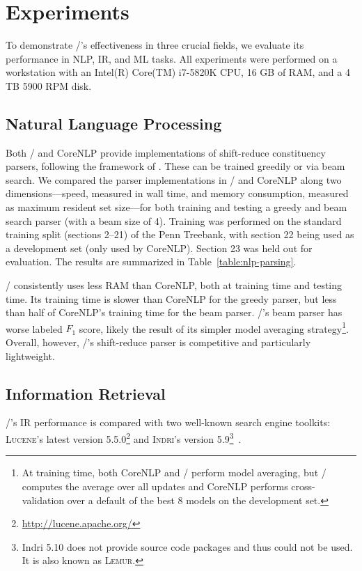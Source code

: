 \section{Experiments}
\label{sec:experiments}

To demonstrate \meta/'s effectiveness in three crucial fields, we evaluate its
performance in NLP, IR, and ML tasks. All experiments were performed on a
workstation with an Intel(R) Core(TM) i7-5820K CPU, 16 GB of RAM, and a 4
TB 5900 RPM disk.

\subsection{Natural Language Processing}




Both \meta/ and CoreNLP provide implementations of shift-reduce
constituency parsers, following the framework of .
These can be trained greedily or via beam search. We compared the parser
implementations in \meta/ and CoreNLP along two dimensions---speed,
measured in wall time, and memory consumption, measured as maximum resident
set size---for both training and testing a greedy and beam search parser
(with a beam size of 4). Training was performed on the standard training
split (sections 2--21) of the Penn Treebank, with section 22 being used as
a development set (only used by CoreNLP). Section 23 was held out for
evaluation. The results are summarized in Table~\ref{table:nlp-parsing}.

\meta/ consistently uses less RAM than CoreNLP, both at training
time and testing time. Its training time is slower than CoreNLP
for the greedy parser, but less than half of CoreNLP's training time for
the beam parser. \meta/'s beam parser has worse labeled $F_1$ score, likely
the result of its simpler model averaging strategy\footnote{At training
time, both CoreNLP and \meta/ perform model averaging, but \meta/
computes the average over all updates and CoreNLP performs
cross-validation over a default of the best 8 models on the development
set.}. Overall, however, \meta/'s shift-reduce parser is competitive and
particularly lightweight.

\subsection{Information Retrieval}

\meta/'s IR performance is compared with two well-known search engine toolkits:
\textsc{Lucene}'s latest version 5.5.0\footnote{\url{http://lucene.apache.org/}} and
\textsc{Indri}'s version 5.9\footnote{Indri 5.10 does not provide source
    code packages and thus could not be used. It is also known as
\textsc{Lemur}.}~\cite{lemur}.


